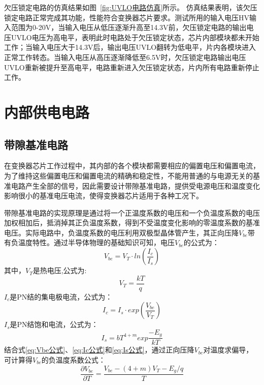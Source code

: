 欠压锁定电路的仿真结果如图~\ref{fig:UVLO电路仿真}所示。
仿真结果表明，该欠压锁定电路正常完成其功能，性能符合变换器芯片要求。测试所用的输入电压HV输入范围为0-20V，当输入电压从低压逐渐升高至14.3V前，欠压锁定电路的输出电压UVLO电压为高电平，表明此时电路处于欠压锁定状态，芯片内部模块都未开始工作；当输入电压大于14.3V后，输出电压UVLO翻转为低电平，片内各模块进入正常工作转态。当输入电压从高压逐渐降低至6.5V时，欠压锁定电路输出电压UVLO重新被提升至高电平，电路重新进入欠压锁定状态，片内所有电路重新停止工作。




\section{内部供电电路}

\subsection{带隙基准电路}

在变换器芯片工作过程中，其内部的各个模块都需要相应的偏置电压和偏置电流，为了维持这些偏置电压和偏置电流的精确和稳定性，不能用普通的与电源无关的基准电路产生全部的信号，因此需要设计带隙基准电路，提供受电源电压和温度变化影响很小的基准电压电流，使得变换器芯片适用于各种工况下。

带隙基准电路的实现原理是通过将一个正温度系数的电压和一个负温度系数的电压加权相加后，抵消掉其正负温度系数，得到不受温度变化影响的零温度系数的基准电压。实际电路中，负温度系数的电压利用双极型晶体管产生，其正向压降$V_{be}$带有负温度特性。通过半导体物理的基础知识可知，电压$V_{be}$的公式为：
\begin{equation}
    \label{eq:Vbe公式}
    V_{be} = V_T \cdot ln(\frac{I_c}{I_s})
\end{equation}
其中，$V_T$是热电压,公式为:
\begin{equation}
    \label{eq:VT公式}
    V_T=\frac{kT}{q}
\end{equation}
$I_c$是PN结的集电极电流，公式为：
\begin{equation}
    \label{eq:Ic公式}
    I_c=I_s \cdot exp(\frac{V_{be}}{V_T})
\end{equation}
$I_s$是PN结饱和电流，公式为：
\begin{equation}
    \label{eq:Is公式}
    I_s=bT^{4+m} exp\frac{-E_g}{kT}
\end{equation}
结合式\eqref{eq:Vbe公式}、\eqref{eq:Ic公式}和\eqref{eq:Is公式}，通过正向压降$V_{be}$对温度求偏导，可计算得$V_{be}$的负温度系数公式：
\begin{equation}
    \label{eq:Vbe/T公式}
    \frac{\partial V_{be}}{\partial T} = \frac{ V_{be} - (4+m)V_T - E_g/q}{T}
\end{equation}

